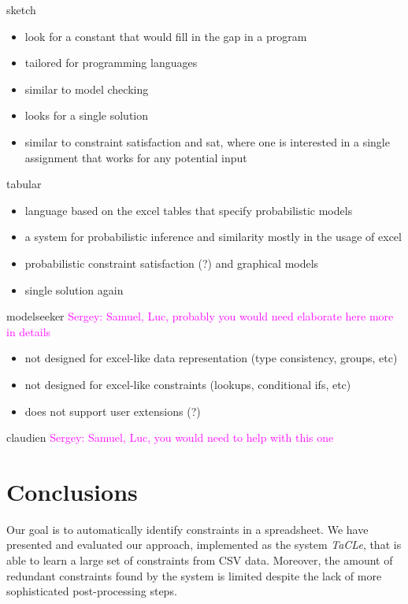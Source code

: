 \documentclass{IEEEtran}
\newcommand{\sergey}[1]{\textcolor{magenta}{{\sc Sergey:} #1}\xspace}
\newcommand{\format}[1]{\textit{#1}\xspace}
\newcommand{\sname}{\format{TaCLe}}
\theoremstyle{definition}
\begin{document}
sketch \cite{sketch}
\begin{itemize}
  \item look for a constant that would fill in the gap in a program
  \item tailored for programming languages
  \item similar to model checking
  \item looks for a single solution
  \item similar to constraint satisfaction and sat, where one is interested in a single assignment that works for any potential input
\end{itemize}

tabular \cite{tabular}
\begin{itemize}
  \item language based on the excel tables that specify probabilistic models
  \item a system for probabilistic inference and similarity mostly in the usage of excel
  \item probabilistic constraint satisfaction (?) and graphical models
  \item single solution again
\end{itemize}

modelseeker \cite{modelseeker} \sergey{Samuel, Luc, probably you would need elaborate here more in details}

\begin{itemize}
  \item not designed for excel-like data representation (type consistency, groups, etc)
  \item not designed for excel-like constraints (lookups, conditional ifs, etc)
  \item does not support user extensions (?)
\end{itemize}

claudien \cite{claudien} \sergey{Samuel, Luc, you would need to help with this one}

\section{Conclusions}\label{sec:conclusions}

Our goal is to automatically identify constraints in a spreadsheet.
We have presented and evaluated our approach, implemented as the system \sname, that is able to learn a large set of constraints from CSV data.
Moreover, the amount of redundant constraints found by the system is limited despite the lack of more sophisticated post-processing steps.
\end{document}
